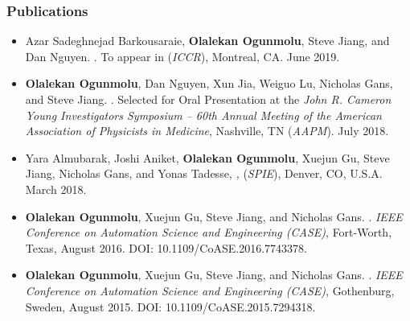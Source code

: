 \begin{frame}
\frametitle{Publications}
	\begin{itemize}
		\tiny \item Azar Sadeghnejad Barkousaraie,  \textbf{Olalekan Ogunmolu}, Steve Jiang, and Dan Nguyen.  \href{}{}. To appear in \textit{} (\emph{ICCR}), Montreal, CA. June 2019.
		\vspace{0.5em}
		\tiny \item \textbf{Olalekan Ogunmolu}, Dan Nguyen, Xun Jia, Weiguo Lu, Nicholas Gans, and Steve Jiang. \href{}{}.  	%
		Selected for Oral Presentation at the \textit{John R. Cameron Young Investigators Symposium -- 60th Annual Meeting of the American Association of Physicists in Medicine}, Nashville, TN (\emph{AAPM}). July 2018.
		\vspace{0.5em}
		\tiny \item Yara Almubarak, Joshi Aniket, \textbf{Olalekan Ogunmolu}, Xuejun Gu, Steve Jiang, Nicholas Gans, and Yonas Tadesse,  \emph{\href{http://spie.org/conferences-and-exhibitions/smart-structures/nde?SSO=1}{},} (\emph{SPIE}), Denver, CO, U.S.A. March 2018.
		\vspace{0.5em}
		\tiny \item \textbf{Olalekan Ogunmolu}, Xuejun Gu, Steve Jiang, and Nicholas Gans. \href{http://ecs.utdallas.edu/~opo140030/media/Papers/CASE2016.pdf}{}. \emph{IEEE Conference on Automation Science and Engineering (CASE)}, Fort-Worth, Texas, August 2016. DOI: 10.1109/CoASE.2016.7743378.
		\vspace{0.5em}
		\tiny \item \textbf{Olalekan Ogunmolu}, Xuejun Gu, Steve Jiang, and Nicholas Gans. \href{http://ecs.utdallas.edu/~opo140030/media/Papers/CASE2015/CASE2015.pdf}{}. \emph{IEEE Conference on Automation Science and Engineering (CASE)}, Gothenburg, Sweden, August 2015. DOI: 10.1109/CoASE.2015.7294318.
	\end{itemize}
\end{frame}